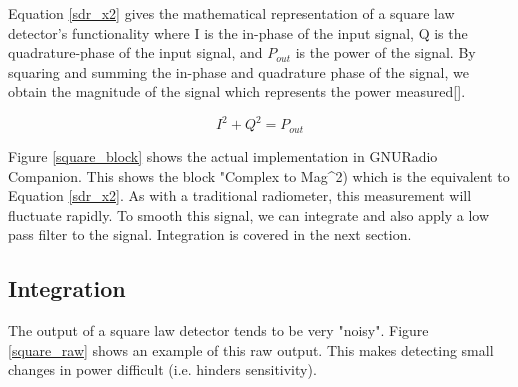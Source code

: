 Equation \ref{sdr_x2} gives the mathematical representation of a square law detector's functionality where I is the in-phase of the input signal, Q is the quadrature-phase of the input signal, and $P_{out}$ is the power of the signal.  By squaring and summing the in-phase and quadrature phase of the signal, we obtain the magnitude of the signal which represents the power measured[\cite{Rashid}].  



\begin{equation}\label{sdr_x2}
I^2+Q^2 = P_{out}
\end{equation}

Figure \ref{square_block} shows the actual implementation in GNURadio Companion.  This shows the block "Complex to Mag^2) which is the equivalent to Equation \ref{sdr_x2}.  As with a traditional radiometer, this measurement will fluctuate rapidly.  To smooth this signal, we can integrate and also apply a low pass filter to the signal.  Integration is covered in the next section.



\subsection{Integration}

The output of a square law detector tends to be very "noisy".  Figure \ref{square_raw} shows an example of this raw output.  This makes detecting small changes in power difficult (i.e. hinders sensitivity).  

